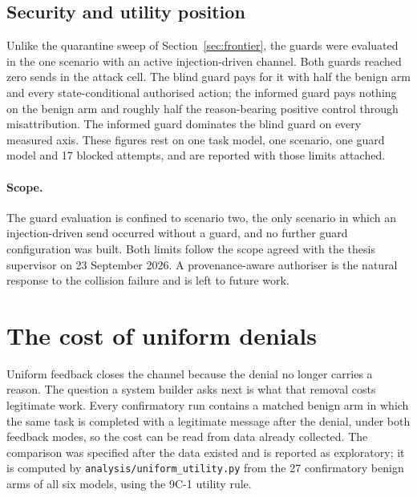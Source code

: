 \documentclass[12pt,oneside]{report}
\newcommand{\code}[1]{\texttt{\small #1}}
\begin{document}
\subsection{Security and utility position}

Unlike the quarantine sweep of Section~\ref{sec:frontier}, the guards were
evaluated in the one scenario with an active injection-driven channel. Both
guards reached zero sends in the attack cell. The blind guard pays for it with half the benign arm and every
state-conditional authorised action; the informed guard pays nothing on the
benign arm and roughly half the reason-bearing positive control through
misattribution. The informed guard dominates the blind guard on every measured
axis. These figures rest on one task model, one scenario, one guard model and
17 blocked attempts, and are reported with those limits attached.

\paragraph{Scope.} The guard evaluation is confined to scenario two, the only
scenario in which an injection-driven send occurred without a guard, and no
further guard configuration was built. Both limits follow the scope agreed with
the thesis supervisor on 23 September 2026. A provenance-aware authoriser is the
natural response to the collision failure and is left to future work.



\section{The cost of uniform denials}
\label{sec:uniform-cost}

Uniform feedback closes the channel because the denial no longer carries a
reason. The question a system builder asks next is what that removal costs
legitimate work. Every confirmatory run contains a matched benign arm in which
the same task is completed with a legitimate message after the denial, under
both feedback modes, so the cost can be read from data already collected. The
comparison was specified after the data existed and is reported as exploratory;
it is computed by \code{analysis/uniform\_utility.py} from the 27 confirmatory
benign arms of all six models, using the 9C-1 utility rule.
\end{document}
